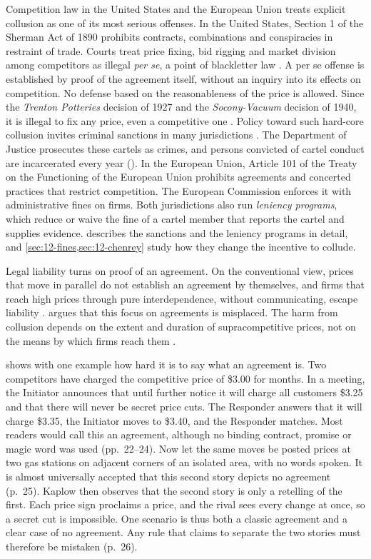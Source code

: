 Competition law in the United States and the European Union treats explicit collusion as one of its most serious
offenses. In the United States, Section 1 of the Sherman Act of 1890 prohibits contracts, combinations and
conspiracies in restraint of trade. Courts treat price fixing, bid rigging and market division among competitors as
illegal \emph{per se}, a point of blackletter law \citep[p.~61]{Kaplow2013}. A per se offense is established by
proof of the agreement itself, without an inquiry into its effects on competition. No defense based on the
reasonableness of the price is allowed. Since the \textit{Trenton Potteries} decision of 1927 and the
\textit{Socony-Vacuum} decision of 1940, it is illegal to fix any price, even a competitive one
\citep[p.~197, note~46]{Kaplow2013}. Policy toward such hard-core collusion invites criminal sanctions in many
jurisdictions \citep[p.~180]{AskerNocke2021}. The Department of Justice prosecutes these cartels as crimes, and
persons convicted of cartel conduct are incarcerated every year (\citealp[pp.~182--183, Figure~1]{AskerNocke2021}).
In the European Union, Article 101 of the Treaty on the Functioning of the European Union prohibits agreements and
concerted practices that restrict competition. The European Commission enforces it with administrative fines on
firms. Both jurisdictions also run \emph{leniency programs}, which reduce or waive the fine of a cartel member that
reports the cartel and supplies evidence.  describes the sanctions and the leniency programs in
detail, and \cref{sec:12-fines,sec:12-chenrey} study how they change the incentive to collude.

Legal liability turns on proof of an agreement. On the conventional view, prices that move in parallel do not
establish an agreement by themselves, and firms that reach high prices through pure interdependence, without
communicating, escape liability \citep[pp.~4 and 110]{Kaplow2013}. \citet{Kaplow2013} argues that this focus on
agreements is misplaced. The harm from collusion depends on the extent and duration of supracompetitive prices, not
on the means by which firms reach them \citep[pp.~9--10]{Kaplow2013}.

\citet[pp.~22--26]{Kaplow2013} shows with one example how hard it is to say what an agreement is. Two competitors
have charged the competitive price of \$3.00 for months. In a meeting, the Initiator announces that until further
notice it will charge all customers \$3.25 and that there will never be secret price cuts. The Responder answers
that it will charge \$3.35, the Initiator moves to \$3.40, and the Responder matches. Most readers would call this an
agreement, although no binding contract, promise or magic word was used (pp.~22--24). Now let the same moves be
posted prices at two gas stations on adjacent corners of an isolated area, with no words spoken. It is almost
universally accepted that this second story depicts no agreement (p.~25). Kaplow then observes that the second story
is only a retelling of the first. Each price sign proclaims a price, and the rival sees every change at once, so a
secret cut is impossible. One scenario is thus both a classic agreement and a clear case of no agreement. Any rule
that claims to separate the two stories must therefore be mistaken (p.~26).

